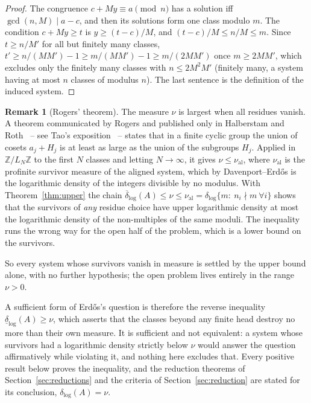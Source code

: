 \documentclass[11pt]{article}
\theoremstyle{plain}
\theoremstyle{definition}
\newtheorem{remark}[theorem]{Remark}
\newcommand{\dlog}{\delta_{\log}}
\begin{document}
\begin{proof}
The congruence $c+My\equiv a\pmod n$ has a solution iff
$\gcd(n,M)\mid a-c$, and then its solutions form one class
modulo $m$.  The condition $c+My\ge t$ is $y\ge(t-c)/M$, and
$(t-c)/M\le n/M\le m$.  Since $t\ge n/M'$ for all but finitely
many classes, $t'\ge n/(MM')-1\ge m/(MM')-1\ge m/(2MM')$ once
$m\ge2MM'$, which excludes only the finitely many classes with
$n\le 2M^2M'$ (finitely many, a system having at most $n$
classes of modulus $n$).  The last sentence is the definition of the
induced system.
\end{proof}

\begin{remark}[Rogers' theorem]\label{rem:rogers}
The measure $\nu$ is largest when all residues vanish.  A
theorem communicated by Rogers and published only in
Halberstam and Roth~\cite[Ch.~V]{HaRo66} -- see Tao's
exposition~\cite{TaoRogers} -- states that in a finite cyclic
group the union of cosets $a_j+H_j$ is at least as large as the
union of the subgroups $H_j$.  Applied in $\mathbb{Z}/L_N\mathbb{Z}$
to the first $N$ classes and letting $N\to\infty$, it gives
$\nu\le\nu_{\mathrm{al}}$, where $\nu_{\mathrm{al}}$ is the profinite survivor measure
of the aligned system, which by Davenport--Erd\H{o}s is the
logarithmic density of the integers divisible by no modulus.
With Theorem~\ref{thm:upper} the chain
$\overline{\delta}_{\log}(A)\le\nu\le\nu_{\mathrm{al}}=\dlog\{m:\ n_i\nmid m
\ \forall i\}$ shows that the survivors of \emph{any} residue
choice have upper logarithmic density at most the logarithmic
density of the non-multiples of the same moduli.
The inequality runs the wrong way for the open half of the
problem, which is a lower bound on the survivors.
\end{remark}

So every system whose survivors vanish in measure is settled by
the upper bound alone, with no further hypothesis; the open
problem lives entirely in the range $\nu>0$.

A sufficient form of Erd\H{o}s's question is therefore the
reverse inequality
$\underline{\delta}_{\log}(A)\ge\nu$, which asserts that the
classes beyond any finite head destroy no more than their own
measure.  It is sufficient and not equivalent: a system whose
survivors had a logarithmic density strictly below $\nu$ would
answer the question affirmatively while violating it, and
nothing here excludes that.  Every positive result below proves
the inequality, and the reduction theorems of
Section~\ref{sec:reductions} and the criteria of
Section~\ref{sec:reduction} are stated for its conclusion,
$\dlog(A)=\nu$.
\end{document}

